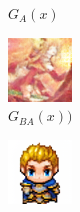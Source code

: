 \documentclass{beamer}
\begin{document}
\begin{frame}
\begin{figure}[htb]
\begin{subfigure}[b]{0.23\linewidth}
        \caption{$G_A(x)$}
      \end{subfigure}
      \begin{subfigure}[b]{0.23\linewidth}
        \includegraphics[width=\linewidth]{exp2_epoch100_rec_A.png}
        \caption{$G_{BA}(x))$}
      \end{subfigure}
      \begin{subfigure}[b]{0.23\linewidth}
        \includegraphics[width=\linewidth]{exp2_epoch100_idt_A.png}

\end{subfigure}
\end{figure}
\end{frame}
\end{document}
